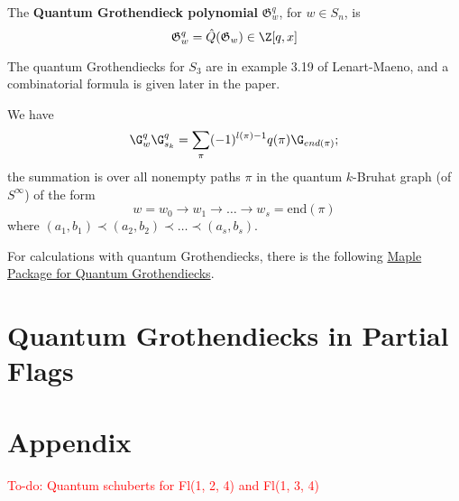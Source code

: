 \documentclass[11pt]{article}
\begin{document}
\begin{definition}
    The \textbf{Quantum Grothendieck polynomial} $\mathfrak{G}_w^q$, for $w \in S_n$, is
    \begin{equation*}
        \mathfrak{G}_w^q = \hat{Q}(\mathfrak{G}_w) \in \Z[q,x]
    \end{equation*}
\end{definition}
The quantum Grothendiecks for $S_3$ are in example 3.19 of Lenart-Maeno, and a combinatorial formula is given later in the paper. \\

\begin{theorem}

We have
\begin{equation*}
    \G_w^q \G_{s_k}^q = \sum_\pi (-1)^{l(\pi)- 1}q(\pi) \G_{end(\pi)} ; 
\end{equation*}
the summation is over all nonempty paths $\pi$ in the quantum $k$-Bruhat graph (of $S^\infty$) of the form 
\begin{equation*}
    w = w_0 \rightarrow w_1 \rightarrow \ldots \rightarrow w_s = \text{end}(\pi)
\end{equation*}
where $(a_1, b_1) \prec (a_2,b_2) \prec \ldots \prec (a_s,b_s)$.
\end{theorem}

For calculations with quantum Grothendiecks, there is the following \href{https://ow3.math.rutgers.edu/~asbuch/equivcalc/}{Maple Package for Quantum Grothendiecks}.

\section{Quantum Grothendiecks in Partial Flags}


\newpage

\section{Appendix}

\textcolor{red}{To-do: Quantum schuberts for Fl(1, 2, 4) and Fl(1, 3, 4)}
\end{document}
